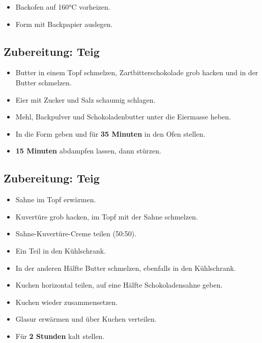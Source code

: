     \begin{itemize}
        \item Backofen auf 160°C vorheizen.
        \item Form mit Backpapier auslegen.
    \end{itemize}


\bigbreak
\subsection*{Zubereitung: Teig}

    \begin{itemize}
        \item Butter in einem Topf schmelzen, Zartbitterschokolade grob hacken und in der Butter schmelzen.
        \item Eier mit Zucker und Salz schaumig schlagen.
        \item Mehl, Backpulver und Schokoladenbutter unter die Eiermasse heben.
        \item In die Form geben und für \textbf{35 Minuten} in den Ofen stellen.
        \item \textbf{15 Minuten} abdampfen lassen, dann stürzen.
    \end{itemize}


\bigbreak
\subsection*{Zubereitung: Teig}

    \begin{itemize}
        \item Sahne im Topf erwärmen.
        \item Kuvertüre grob hacken, im Topf mit der Sahne schmelzen.
        \item Sahne-Kuvertüre-Creme teilen (50:50).
        \item Ein Teil in den Kühlschrank.
        \item In der anderen Hälfte Butter schmelzen, ebenfalls in den Kühlschrank.
        \item Kuchen horizontal teilen, auf eine Hälfte Schokoladensahne geben.
        \item Kuchen wieder zusammensetzen.
        \item Glasur erwärmen und über Kuchen verteilen.
        \item Für \textbf{2 Stunden} kalt stellen.
    \end{itemize}

